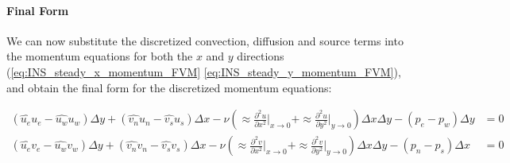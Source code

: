 %
%
\paragraph{Final Form}

We can now substitute the discretized convection, diffusion and source terms into the momentum equations for both the $x$ and $y$ directions (\ref{eq:INS_steady_x_momentum_FVM} \ref{eq:INS_steady_y_momentum_FVM}), and obtain the final form for the discretized momentum equations:

\begin{align}
    \label{eq:INS_steady_2D_discretized_momentum_x_final}
    (\hat{u_e} u_e - \hat{u_w} u_w) \Delta y + (\hat{v_n} u_n - \hat{v_s} u_s) \Delta x - \nu \left( \approx \frac{\partial^2 u}{\partial x^2} \bigg|_{x \to 0} +  \approx \frac{\partial^2 u}{\partial y^2} \bigg|_{y \to 0} \right) \Delta x \Delta y - (p_e - p_w) \Delta y & = 0 \\
    \label{eq:INS_steady_2D_discretized_momentum_y_final}
    (\hat{u_e} v_e - \hat{u_w} v_w) \Delta y + (\hat{v_n} v_n - \hat{v_s} v_s) \Delta x - \nu \left( \approx \frac{\partial^2 v}{\partial x^2} \bigg|_{x \to 0} +  \approx \frac{\partial^2 v}{\partial y^2} \bigg|_{y \to 0} \right) \Delta x \Delta y - (p_n - p_s) \Delta x & = 0
\end{align}




